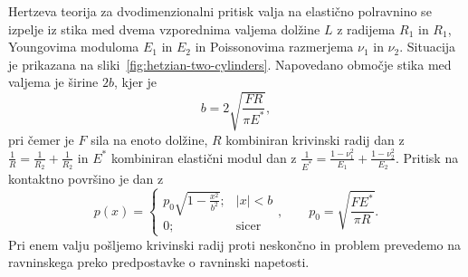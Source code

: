 \documentclass[12pt,a4paper,twoside]{article}
\theoremstyle{definition} %
\theoremstyle{plain} %
\numberwithin{equation}{section}
\begin{document}
Hertzeva teorija za dvodimenzionalni pritisk valja na elastično polravnino se izpelje iz stika med
dvema vzporednima valjema dolžine $L$ z radijema $R_1$ in $R_1$, Youngovima moduloma $E_1$ in $E_2$
in Poissonovima razmerjema $\nu_1$ in $\nu_2$. Situacija je prikazana na
sliki~\ref{fig:hetzian-two-cylinders}.
Napovedano območje stika med valjema je širine $2b$, kjer je \[
  b = 2\sqrt{\frac{F R}{\pi E^\ast}},
\]
pri čemer je $F$ sila na enoto dolžine, $R$ kombiniran krivinski radij dan z $\frac1R = \frac1{R_2}
+ \frac1{R_2}$ in $E^\ast$ kombiniran elastični modul dan z $\frac{1}{E^\ast} = \frac{1-\nu_1^2}{E_1}
+ \frac{1-\nu_2^2}{E_2}$. Pritisk na kontaktno površino je dan z
\[
  p(x) = \begin{cases}
    p_0 \sqrt{1-\frac{x^2}{b^2}}; & |x| < b \\
    0; & \text{sicer}
  \end{cases}, \qquad p_0 = \sqrt{\frac{FE^\ast}{\pi R}}.
\]
Pri enem valju pošljemo krivinski radij proti
neskončno in problem prevedemo na ravninskega preko predpostavke o ravninski napetosti.
\end{document}
